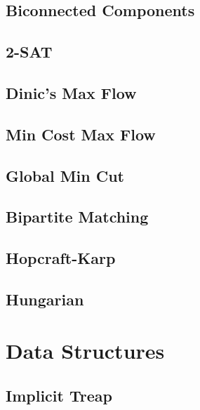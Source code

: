 \subsection{Biconnected Components}
\raggedbottom
\hrulefill
\subsection{2-SAT}
\raggedbottom
\hrulefill
\subsection{Dinic's Max Flow}
\raggedbottom
\hrulefill
\subsection{Min Cost Max Flow}
\raggedbottom
\hrulefill
\subsection{Global Min Cut}
\raggedbottom
\hrulefill
\subsection{Bipartite Matching}
\raggedbottom
\hrulefill
\subsection{Hopcraft-Karp}
\raggedbottom
\hrulefill
\subsection{Hungarian}
\raggedbottom
\hrulefill

\section{Data Structures}
\subsection{Implicit Treap}
\raggedbottom
\hrulefill
